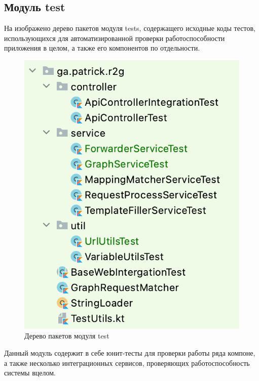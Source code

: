 \subsection{Модуль test}\label{subsec:module-test}

На  изображено дерево пакетов модуля tests, содержащего исходные коды тестов, использующихся для автоматизированной проверки работоспособности приложения в целом, а также его компонентов по отдельности.

\begin{figure}[ht!]
	\center
	\includegraphics [scale=0.6] {my_folder/images/ch3-tests}
	\caption{Дерево пакетов модуля test}
	\label{fig:ch3-tests}
\end{figure}



Данный модуль содержит в себе юнит-тесты для проверки работы ряда компоне, а также несколько интеграционных сервисов, проверяющих работоспособность системы вцелом.

